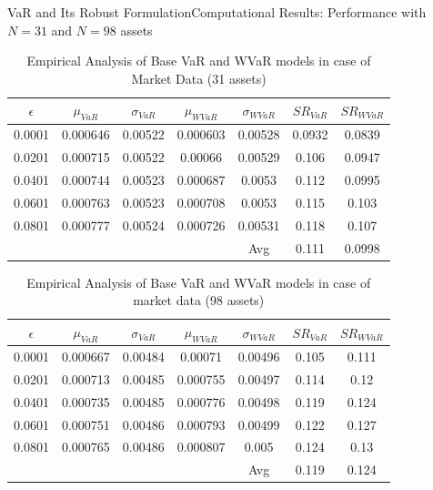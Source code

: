 \documentclass{beamer}
\begin{document}
\begin{frame}{VaR and Its Robust Formulation}{Computational Results: Performance with $N=31$ and $N=98$ assets}
\begin{table}[!h]
\centering
\tiny
\captionsetup{justification=centering}
\begin{tabular}{||c|c|c|c|c|c|c||}
\hline
$\epsilon$ & $\mu_{VaR}$ & $\sigma_{VaR}$ & $\mu_{WVaR}$ & $\sigma_{WVaR}$ & $SR_{VaR}$ & $SR_{WVaR}$\\
\hline
0.0001 & 0.000646 & 0.00522 & 0.000603 & 0.00528 & 0.0932 & 0.0839 \\
0.0201 & 0.000715 & 0.00522 & 0.00066 & 0.00529 & 0.106 & 0.0947 \\
0.0401 & 0.000744 & 0.00523 & 0.000687 & 0.0053 & 0.112 & 0.0995 \\
0.0601 & 0.000763 & 0.00523 & 0.000708 & 0.0053 & 0.115 & 0.103 \\
0.0801 & 0.000777 &0.00524 & 0.000726 & 0.00531 & 0.118 & 0.107 \\
\hline
& & & & Avg & 0.111	& 0.0998 \\
\hline
\end{tabular}
\caption{Empirical Analysis of Base VaR and WVaR models in case of Market Data (31 assets)}
\label{tab:5.1}
\end{table}

\begin{table}[!h]
\centering
\tiny
\captionsetup{justification=centering}
\begin{tabular}{||c|c|c|c|c|c|c||}
\hline
$\epsilon$ & $\mu_{VaR}$ & $\sigma_{VaR}$ & $\mu_{WVaR}$ & $\sigma_{WVaR}$ & $SR_{VaR}$ & $SR_{WVaR}$\\
\hline
0.0001 & 0.000667 & 0.00484 & 0.00071 & 0.00496 & 0.105 & 0.111 \\ 
0.0201 & 0.000713 & 0.00485 & 0.000755 & 0.00497 & 0.114 & 0.12 \\
0.0401 & 0.000735 & 0.00485 & 0.000776 & 0.00498 & 0.119 & 0.124 \\
0.0601 & 0.000751 & 0.00486 & 0.000793 & 0.00499 & 0.122 & 0.127 \\
0.0801 & 0.000765 & 0.00486 & 0.000807 & 0.005 & 0.124 & 0.13 \\
\hline
& & & & Avg & 0.119 & 0.124 \\
\hline
\end{tabular}
\caption{Empirical Analysis of Base VaR and WVaR models in case of market data (98 assets)}
\label{tab:5.4}
\end{table}
\end{frame}
\end{document}
